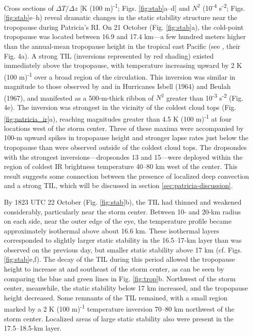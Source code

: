 Cross sections of $\Delta T/\Delta z$ [K (100 m)\textsuperscript{-1}; Figs. \ref{fig:stab}a–d] and $N^2$ (10\textsuperscript{-4} s\textsuperscript{-2}; Figs. \ref{fig:stab}e–h) reveal dramatic changes in the static stability structure near the tropopause during Patricia’s RI.
On 21 October (Fig. \ref{fig:stab}a), the cold-point tropopause was located between 16.9 and 17.4 km---a few hundred meters higher than the annual-mean tropopause height in the tropical east Pacific (see \citeauthor{Seideletal2001} \citeyear{Seideletal2001}, their Fig. 4a).
A strong TIL (inversions represented by red shading) existed immediately above the tropopause, with temperature increasing upward by 2 K (100 m)\textsuperscript{-1} over a broad region of the circulation.
This inversion was similar in magnitude to those observed by \cite{Gentry1967} and \cite{Waco1970} in Hurricanes Isbell (1964) and Beulah (1967), and manifested as a 500-m-thick ribbon of $N^2$ greater than 10\textsuperscript{-3} s\textsuperscript{-2} (Fig. 4e).
The inversion was strongest in the vicinity of the coldest cloud tops (Fig. \ref{fig:patricia_ir}a), reaching magnitudes greater than 4.5 K (100 m)\textsuperscript{-1} at four locations west of the storm center.
Three of these maxima were accompanied by 100-m upward spikes in tropopause height and stronger lapse rates just below the tropopause than were observed outside of the coldest cloud tops.
The dropsondes with the strongest inversions---dropsondes 13 and 15---were deployed within the region of coldest IR brightness temperature 40–80 km west of the center.
This result suggests some connection between the presence of localized deep convection and a strong TIL, which will be discussed in section \ref{sec:patricia-discussion}.

By 1823 UTC 22 October (Fig. \ref{fig:stab}b), the TIL had thinned and weakened considerably, particularly near the storm center.
Between 10- and 20-km radius on each side, near the outer edge of the eye, the temperature profile became approximately isothermal above about 16.6 km.
These isothermal layers corresponded to slightly larger static stability in the 16.5–17-km layer than was observed on the previous day, but smaller static stability above 17 km (cf. Figs. \ref{fig:stab}e,f).
The decay of the TIL during this period allowed the tropopause height to increase at and southeast of the storm center, as can be seen by comparing the blue and green lines in Fig. \ref{fig:trop}b.
Northwest of the storm center, meanwhile, the static stability below 17 km increased, and the tropopause height decreased. Some remnants of the TIL remained, with a small region marked by a 2 K (100 m)\textsuperscript{-1} temperature inversion 70–80 km northwest of the storm center.
Localized areas of large static stability also were present in the 17.5–18.5-km layer.

